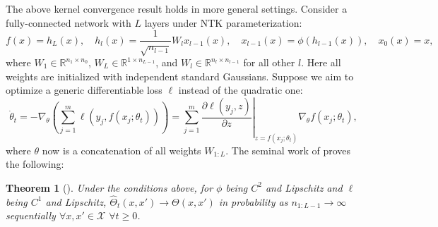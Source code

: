 \documentclass{article}
\newcommand{\XX}{\mathcal{X}}
\newcommand{\RR}{\mathbb{R}}
\newtheorem{theorem}{Theorem}
\begin{document}
    The above kernel convergence result holds in more general settings.
    Consider a fully-connected network with $L$ layers under NTK parameterization:
    \begin{equation}
        f(x) = h_L(x),
        \quad
        h_l(x) = \frac{1}{\sqrt{n_{l-1}}} W_l x_{l-1}(x),
        \quad
        x_{l-1}(x) = \phi(h_{l-1}(x)),
        \quad
        x_0(x) = x,
    \end{equation}
    where $W_1 \in \RR^{n_1 \times n_0}$, $W_L \in \RR^{1 \times n_{L-1}}$, and $W_l \in \RR^{n_l \times n_{l-1}}$ for all other $l$.
    Here all weights are initialized with independent standard Gaussians.
    Suppose we aim to optimize a generic differentiable loss $\ell$ instead of the quadratic one:
    \begin{equation}
        \dot\theta_t
        = -\nabla_\theta\left(\sum_{j=1}^m \ell(y_j, f(x_j; \theta_t))\right)
        = \sum_{j=1}^m \left.\frac{\partial \ell(y_j, z)}{\partial z}\right|_{z=f(x_j; \theta_t)} \nabla_\theta f(x_j; \theta_t),
    \end{equation}
    where $\theta$ now is a concatenation of all weights $W_{1:L}$.
    The seminal work of \cite{jacot2018neural} proves the following:
    \begin{theorem}[\cite{jacot2018neural}]
        Under the conditions above, for $\phi$ being $C^2$ and Lipschitz and $\ell$ being $C^1$ and Lipschitz, $\hat\Theta_t(x,x') \to \Theta(x,x')$ in probability as $n_{1:L-1} \to \infty$ sequentially $\forall x,x' \in \XX$ $\forall t \geq 0$.
    \end{theorem}
\end{document}
